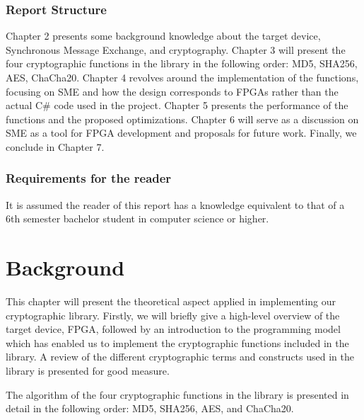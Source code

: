 \documentclass[a4paper, openany]{book}
\begin{document}
\subsection{Report Structure}
\label{sec:org3769dd2}
Chapter 2 presents some background knowledge about the target device, Synchronous Message Exchange, and cryptography. Chapter 3 will present the four cryptographic functions in the library in the following order: MD5, SHA256, AES, ChaCha20. Chapter 4 revolves around the implementation of the functions, focusing on SME and how the design corresponds to FPGAs rather than the actual C\# code used in the project. Chapter 5 presents the performance of the functions and the proposed optimizations. Chapter 6 will serve as a discussion on SME as a tool for FPGA development and proposals for future work. Finally, we conclude in Chapter 7.

\subsection{Requirements for the reader}
\label{sec:org6c54334}
It is assumed the reader of this report has a knowledge equivalent to that of a 6th semester bachelor student in computer science or higher.

\chapter{Background}
\label{sec:org4c5cd61}
This chapter will present the theoretical aspect applied in implementing our cryptographic library. Firstly, we will briefly give a high-level overview of the target device, FPGA, followed by an introduction to the programming model which has enabled us to implement the cryptographic functions included in the library. A review of the different cryptographic terms and constructs used in the library is presented for good measure.

The algorithm of the four cryptographic functions in the library is presented in detail in the following order: MD5, SHA256, AES, and ChaCha20.
\end{document}
